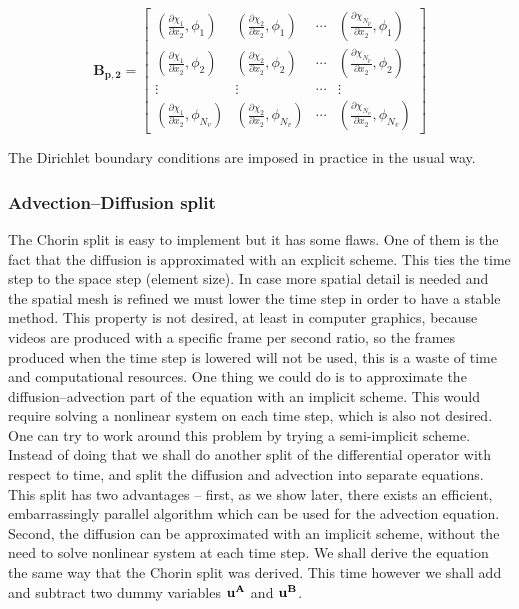 \begin{equation*}
	\mathbf{B_{p,2}} = \begin{bmatrix}
		\left(\frac{\partial\chi_1}{\partial x_2}, \phi_1\right) & \left(\frac{\partial\chi_2}{\partial x_2}, \phi_1\right) & \cdots & \left(\frac{\partial\chi_{N_p}}{\partial x_2}, \phi_1\right) \\
		\left(\frac{\partial\chi_1}{\partial x_2}, \phi_2\right) & \left(\frac{\partial\chi_2}{\partial x_2}, \phi_2\right) & \cdots & \left(\frac{\partial\chi_{N_p}}{\partial x_2}, \phi_2\right) \\
		\vdots & \vdots & \cdots & \vdots \\
		\left(\frac{\partial\chi_1}{\partial x_2}, \phi_{N_v}\right) & \left(\frac{\partial\chi_2}{\partial x_2}, \phi_{N_v}\right) & \cdots & \left(\frac{\partial\chi_{N_v}}{\partial x_2}, \phi_{N_v}\right)
	\end{bmatrix}
\end{equation*}

The Dirichlet boundary conditions are imposed in practice in the usual way.

\subsubsection{Advection--Diffusion split}
The Chorin split is easy to implement but it has some flaws. One of them is the fact that the diffusion is approximated with an explicit scheme. This ties the time step to the space step (element size). In case more spatial detail is needed and the spatial mesh is refined we must lower the time step in order to have a stable method. This property is not desired, at least in computer graphics, because videos are produced with a specific frame per second ratio, so the frames produced when the time step is lowered will not be used, this is a waste of time and computational resources. One thing we could do is to approximate the diffusion--advection part of the equation with an implicit scheme. This would require solving a nonlinear system on each time step, which is also not desired. One can try to work around this problem by trying a semi-implicit scheme. Instead of doing that we shall do another split of the differential operator with respect to time, and split the diffusion and advection into separate equations. This split has two advantages -- first, as we show later, there exists an efficient, embarrassingly parallel algorithm which can be used for the advection equation. Second, the diffusion can be approximated with an implicit scheme, without the need to solve nonlinear system at each time step. We shall derive the equation the same way that the Chorin split was derived. This time however we shall add and subtract two dummy variables $\mathbf{u^A}$ and $\mathbf{u^B}$.

